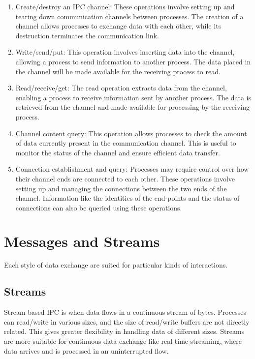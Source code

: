 \documentclass{report}
\begin{document}
\begin{enumerate}[label=\textit{(\roman*)}]
\item Create/destroy an IPC channel: These operations involve setting up and tearing down
  communication channels between processes. The creation of a channel allows processes to exchange
  data with each other, while its destruction terminates the communication link.
\item Write/send/put: This operation involves inserting data into the channel, allowing a process to
  send information to another process. The data placed in the channel will be made available for the
  receiving process to read.
\item Read/receive/get: The read operation extracts data from the channel, enabling a process to
  receive information sent by another process. The data is retrieved from the channel and made
  available for processing by the receiving process.
\item Channel content query: This operation allows processes to check the amount of data currently
  present in the communication channel. This is useful to monitor the status of the channel and ensure
  efficient data transfer.
\item Connection establishment and query: Processes may require control over how their channel ends
  are connected to each other. These operations involve setting up and managing the connections
  between the two ends of the channel. Information like the identities of the end-points and the
  status of connections can also be queried using these operations.
\end{enumerate}





\section{Messages and Streams}
Each style of data exchange are suited for particular kinds of interactions.


\subsection{Streams}
Stream-based IPC is when data flows in a continuous stream of bytes. Processes can read/write in
various sizes, and the size of read/write buffers are not directly related. This gives greater
flexibility in handling data of different sizes. Streams are more suitable for continuous data
exchange like real-time streaming, where data arrives and is processed in an uninterrupted flow.
\end{document}
